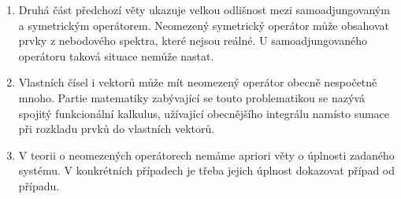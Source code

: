 \begin{remark}
\begin{enumerate}
    \item Druhá část předchozí věty ukazuje velkou odlišnost mezi samoadjungovaným a symetrickým operátorem. Neomezený symetrický operátor může obsahovat prvky z nebodového spektra, které nejsou reálné. U samoadjungovaného operátoru taková situace nemůže nastat.
    \item Vlastních čísel i vektorů může mít neomezený operátor obecně nespočetně mnoho. Partie matematiky zabývající se touto problematikou se nazývá spojitý funkcionální kalkulus, užívající obecnějšího integrálu namísto sumace při rozkladu prvků do vlastních vektorů.
    \item V teorii o neomezených operátorech nemáme apriori věty o úplnosti zadaného systému. V konkrétních případech je třeba jejich úplnost dokazovat případ od případu.
\end{enumerate}
\end{remark}











\pagebreak